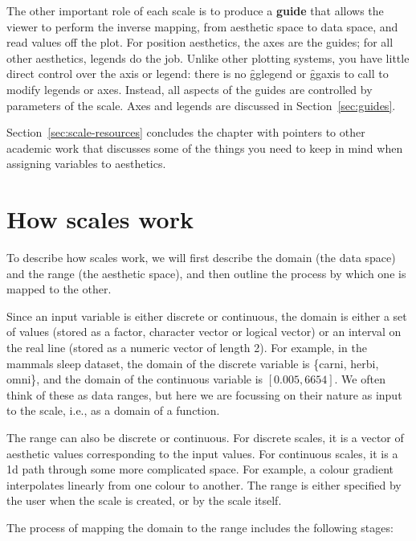 The other important role of each scale is to produce a {\bf guide} that allows the viewer to perform the inverse mapping, from aesthetic space to data space, and read values off the plot. For position aesthetics, the axes are the guides; for all other aesthetics, legends do the job. Unlike other plotting systems, you have little direct control over the axis or legend: there is no \f{gglegend} or \f{ggaxis} to call to modify legends or axes.  Instead, all aspects of the guides are controlled by parameters of the scale. Axes and legends are discussed in Section~\ref{sec:guides}.


Section~\ref{sec:scale-resources} concludes the chapter with pointers to other academic work that discusses some of the things you need to keep in mind when assigning variables to aesthetics.

\section{How scales work}
\label{sec:how-scales-work}

To describe how scales work, we will first describe the domain (the data space) and the range (the aesthetic space), and then outline the process by which one is mapped to the other.

Since an input variable is either discrete or continuous, the domain is either a set of values (stored as a factor, character vector or logical vector) or an interval on the real line (stored as a numeric vector of length 2). For example, in the mammals sleep dataset, the domain of the discrete variable  is \{carni, herbi, omni\}, and the domain of the continuous variable  is $[0.005, 6654]$.  We often think of these as data ranges, but here we are focussing on their nature as input to the scale, i.e., as a domain of a function.

The range can also be discrete or continuous. For discrete scales, it is a vector of aesthetic values corresponding to the input values. For continuous scales, it is a 1d path through some more complicated space. For example, a colour gradient interpolates linearly from one colour to another. The range is either specified by the user when the scale is created, or by the scale itself.

The process of mapping the domain to the range includes the following stages:

